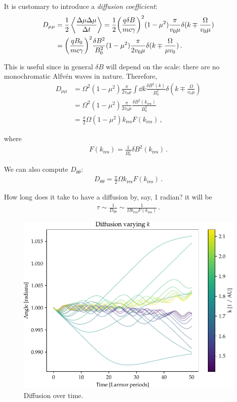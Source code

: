 \documentclass[main.tex]{subfiles}
\begin{document}
It is customary to introduce a \emph{diffusion coefficient}: 
%
\begin{align}
D_{\mu \mu } &= \frac{1}{2} \expval{\frac{\Delta \mu \Delta \mu }{\Delta t}} 
= \frac{1}{2} \qty(\frac{q \delta B}{mc \gamma })^2 (1 - \mu^2)  \frac{\pi}{v_0 \mu } \delta (k \mp \frac{\Omega }{v_0 \mu } )  \\
&= \qty( \frac{q B_0 }{mc \gamma })^2 \frac{ \delta B^2}{B_0^2} (1 - \mu^2) \frac{\pi }{2 v_0 \mu } \delta (k \mp \frac{\Omega}{\mu v_0 }) 
\,.
\end{align}

This is useful since in general \(\delta B\) will depend on the scale: there are no monochromatic Alfvén waves in nature. 
Therefore, 
%
\begin{align}
D_{\mu \mu } &= \Omega^2 (1 - \mu^2) \frac{\pi}{2 v_0 \mu } \int \dd{k} \frac{ \delta B^2 (k)}{B_0^2} \delta (k \mp \frac{\Omega}{v_0 \mu })  \\
&= \Omega^2 (1 - \mu^2) \frac{\pi }{2 v_0 \mu } \frac{ \delta B^2 (k _{\text{res}})}{B_0^2}  \\
&= \frac{\pi}{2} \Omega (1 - \mu^2) k _{\text{res}} F(k _{\text{res}})
\,,
\end{align}

where 
%
\begin{align}
F (k _{\text{res}}) = \frac{1}{B_0^2} \delta B^2 (k _{\text{res}})
\,.
\end{align}

We can also compute \(D_{\theta \theta }\): 
%
\begin{align}
D_{\theta \theta } = \frac{\pi}{2} \Omega k _{\text{res}} F(k _{\text{res}})
\,.
\end{align}

How long does it take to have a diffusion by, say, 1 radian? it will be 
%
\begin{align}
\tau \sim \frac{1}{D_{\theta \theta }} \sim \frac{1}{\Omega k _{\text{res}} F(k _{\text{res}})}
\,.
\end{align}

\begin{figure}[ht]
\centering
\includegraphics[width=\textwidth]{figures/diffusion_over_time}
\caption{Diffusion over time.}
\label{fig:diffusion_over_time}
\end{figure}
\end{document}
